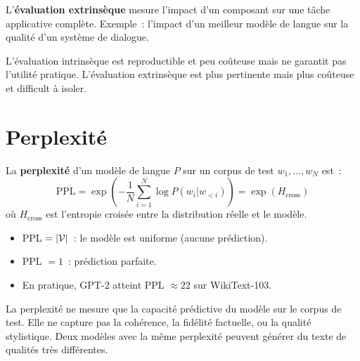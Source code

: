 \begin{definition}
L'\textbf{\'evaluation extrins\`eque} mesure l'impact d'un composant
sur une t\^ache applicative compl\`ete. Exemple~: l'impact d'un meilleur
mod\`ele de langue sur la qualit\'e d'un syst\`eme de dialogue.
\end{definition}

\begin{remarque}
L'\'evaluation intrins\`eque est reproductible et peu co\^uteuse mais ne
garantit pas l'utilit\'e pratique. L'\'evaluation extrins\`eque est plus
pertinente mais plus co\^uteuse et difficult \`a isoler.
\end{remarque}

\section{Perplexit\'e}
\label{sec:eval:perplexite}

\begin{definition}[Perplexit\'e]
La \textbf{perplexit\'e} d'un mod\`ele de langue $P$ sur un corpus de
test $w_1, \ldots, w_N$ est~:
\[
    \text{PPL} = \exp\left(-\frac{1}{N} \sum_{i=1}^{N}
    \log P(w_i | w_{<i})\right)
    = \exp(H_{\text{cross}})
\]
o\`u $H_{\text{cross}}$ est l'entropie crois\'ee entre la distribution
r\'eelle et le mod\`ele.
\end{definition}

\begin{proposition}
\begin{itemize}
    \item PPL $= \left| \mathcal{V} \right|$~: le mod\`ele est uniforme (aucune
    pr\'ediction).
    \item PPL $= 1$~: pr\'ediction parfaite.
    \item En pratique, GPT-2 atteint PPL $\approx 22$ sur WikiText-103.
\end{itemize}
\end{proposition}

\begin{attention}[title=\textbf{Limites de la perplexit\'e}]
La perplexit\'e ne mesure que la capacit\'e pr\'edictive du mod\`ele sur
le corpus de test. Elle ne capture pas la coh\'erence, la fid\'elit\'e
factuelle, ou la qualit\'e stylistique. Deux mod\`eles avec la m\^eme
perplexit\'e peuvent g\'en\'erer du texte de qualit\'es tr\`es diff\'erentes.
\end{attention}

